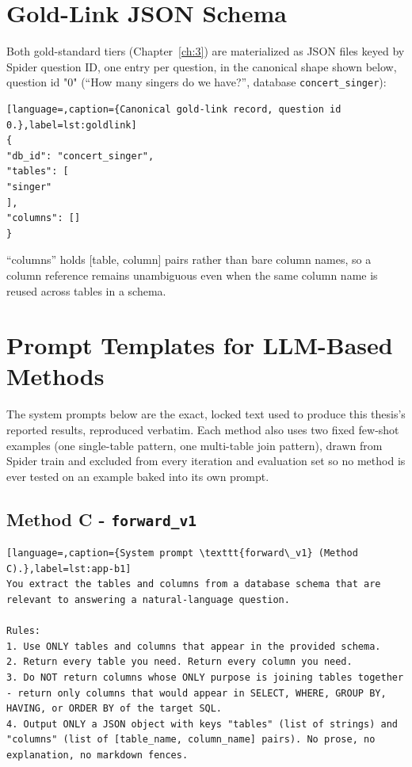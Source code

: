 \chapter{Gold-Link JSON Schema}\label{app:A}

Both gold-standard tiers (Chapter~\ref{ch:3}) are materialized as JSON files keyed by Spider question ID, one entry per question, in the canonical shape shown below, question id "0" (``How many singers do we have?'', database \texttt{concert\_singer}):

\begin{lstlisting}[language=,caption={Canonical gold-link record, question id 0.},label=lst:goldlink]
{
"db_id": "concert_singer",
"tables": [
"singer"
],
"columns": []
}
\end{lstlisting}

``columns'' holds {[}table, column{]} pairs rather than bare column names, so a column reference remains unambiguous even when the same column name is reused across tables in a schema.

\chapter{Prompt Templates for LLM-Based Methods}\label{app:B}

The system prompts below are the exact, locked text used to produce this thesis's reported results, reproduced verbatim. Each method also uses two fixed few-shot examples (one single-table pattern, one multi-table join pattern), drawn from Spider train and excluded from every iteration and evaluation set so no method is ever tested on an example baked into its own prompt.

\section{Method C - \texttt{forward\_v1}}\label{app:B-1}

\begin{lstlisting}[language=,caption={System prompt \texttt{forward\_v1} (Method C).},label=lst:app-b1]
You extract the tables and columns from a database schema that are relevant to answering a natural-language question.

Rules:
1. Use ONLY tables and columns that appear in the provided schema.
2. Return every table you need. Return every column you need.
3. Do NOT return columns whose ONLY purpose is joining tables together - return only columns that would appear in SELECT, WHERE, GROUP BY, HAVING, or ORDER BY of the target SQL.
4. Output ONLY a JSON object with keys "tables" (list of strings) and "columns" (list of [table_name, column_name] pairs). No prose, no explanation, no markdown fences.
\end{lstlisting}

